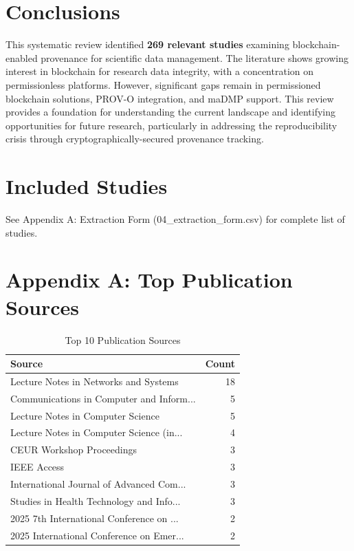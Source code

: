 \documentclass{article}
\begin{document}
\section{Conclusions}

This systematic review identified \textbf{269 relevant studies} examining blockchain-enabled provenance for scientific data management. 
The literature shows growing interest in blockchain for research data integrity, with a concentration on permissionless platforms. 
However, significant gaps remain in permissioned blockchain solutions, PROV-O integration, and maDMP support. 
This review provides a foundation for understanding the current landscape and identifying opportunities for future research, 
particularly in addressing the reproducibility crisis through cryptographically-secured provenance tracking.

\section{Included Studies}

See Appendix A: Extraction Form (04_extraction_form.csv) for complete list of studies.

\section*{Appendix A: Top Publication Sources}

\begin{table}[htbp]
\centering
\caption{Top 10 Publication Sources}
\begin{tabular}{lr}
\toprule
Source & Count \\
\midrule
Lecture Notes in Networks and Systems & 18 \\
Communications in Computer and Inform... & 5 \\
Lecture Notes in Computer Science & 5 \\
Lecture Notes in Computer Science (in... & 4 \\
CEUR Workshop Proceedings & 3 \\
IEEE Access & 3 \\
International Journal of Advanced Com... & 3 \\
Studies in Health Technology and Info... & 3 \\
2025 7th International Conference on ... & 2 \\
2025 International Conference on Emer... & 2 \\
\bottomrule
\end{tabular}
\end{table}
\end{document}
